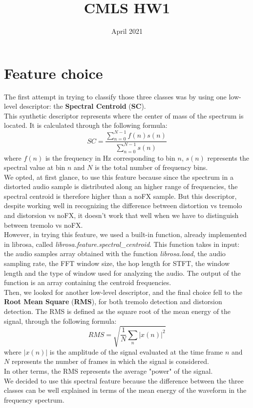 \documentclass{article}
\title{CMLS HW1}
\author{}
\date{April 2021}
\begin{document}
\maketitle

\section{Feature choice}
The first attempt in trying to classify those three classes was by using one low-level descriptor: the \textbf{Spectral Centroid} (\textbf{SC}).
\\This synthetic descriptor represents where the center of mass of the spectrum is located. It is calculated through the following formula:
\[ SC =\frac{\sum_{n=0}^{N-1}f(n)s(n)}{\sum_{n=0}^{N-1}s(n)}  \] where $f(n)$ is the frequency in Hz corresponding to bin $n$, $s(n)$ represents the spectral value at bin $n$ and $N$ is the total number of frequency bins.
\\We opted, at first glance, to use this feature because since the spectrum in a distorted audio sample is distributed along an higher range of frequencies, the spectral centroid is therefore higher than a noFX sample. But this descriptor, despite working well in recognizing the difference between distortion vs tremolo and distorsion vs noFX, it doesn't work that well when we have to distinguish between tremolo vs noFX.
\\However, in trying this feature, we used a built-in function, already implemented in librosa, called \emph{librosa.feature.spectral\_centroid}. This function takes in input: the audio samples array obtained with the function \emph{librosa.load}, the audio sampling rate, the FFT window size, the hop length for STFT, the window length and the type of window used for analyzing the audio. The output of the function is an array containing the centroid frequencies.
\\Then, we looked for another low-level descriptor, and the final choice fell to the \textbf{Root Mean Square} (\textbf{RMS}), for both tremolo detection and distorsion detection. 
The RMS is defined as the square root of the mean energy of the signal, through the following formula:
\[ RMS =\sqrt{\frac{1}{N}\sum_{n}^{}|x(n)|^2}  \] where $|x(n)|$ is the amplitude of the signal evaluated at the time frame $n$ and $N$ represents the number of frames in which the signal is considered.
\\In other terms, the RMS represents the average "power" of the signal.
\\We decided to use this spectral feature because the difference between the three classes can be well explained in terms of the mean energy of the waveform in the frequency spectrum.
\end{document}

